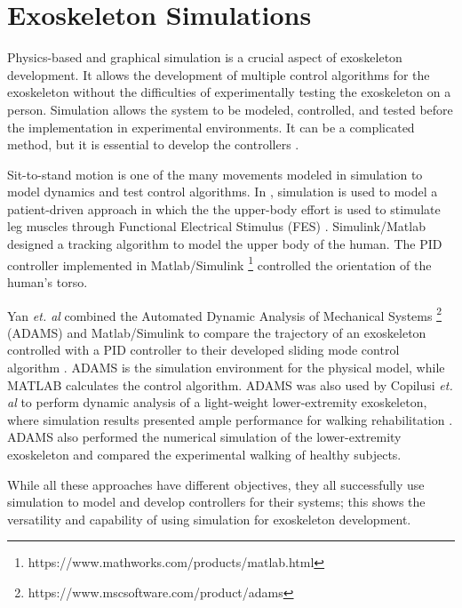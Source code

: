 \section{Exoskeleton Simulations}
Physics-based and graphical simulation is a crucial aspect of exoskeleton development. It allows the development of multiple control algorithms for the exoskeleton without the difficulties of experimentally testing the exoskeleton on a person. Simulation allows the system to be modeled, controlled, and tested before the implementation in experimental environments. It can be a complicated method, but it is essential to develop the controllers \cite{ZLAJPAH2008879}.   

Sit-to-stand motion is one of the many movements modeled in simulation to model dynamics and test control algorithms. In \cite{reiner1998patient}, simulation is used to model a patient-driven approach in which the the upper-body effort is used to stimulate leg muscles through Functional Electrical Stimulus (FES) \cite{lynch2008functional} \cite{rushton1997functional}. Simulink/Matlab designed a tracking algorithm to model the upper body of the human. The PID controller implemented in Matlab/Simulink \footnote{https://www.mathworks.com/products/matlab.html} controlled the orientation of the human's torso. 

Yan \textit{et. al} combined the Automated Dynamic Analysis of Mechanical Systems \footnote{https://www.mscsoftware.com/product/adams} (ADAMS) and Matlab/Simulink to compare the trajectory of an exoskeleton controlled with a PID controller to their developed sliding mode control algorithm \cite{Yan_2017}. ADAMS is the simulation environment for the physical model, while MATLAB calculates the control algorithm. ADAMS was also used by Copilusi \textit{et. al} to perform dynamic analysis of a light-weight lower-extremity exoskeleton, where simulation results presented ample performance for walking rehabilitation  \cite{copilusi2014}. ADAMS also performed the numerical simulation \cite{geonea2017design} of the lower-extremity exoskeleton and compared the experimental walking of healthy subjects. 

While all these approaches have different objectives, they all successfully use simulation to model and develop controllers for their systems;   this shows the versatility and capability of using simulation for exoskeleton development. 
